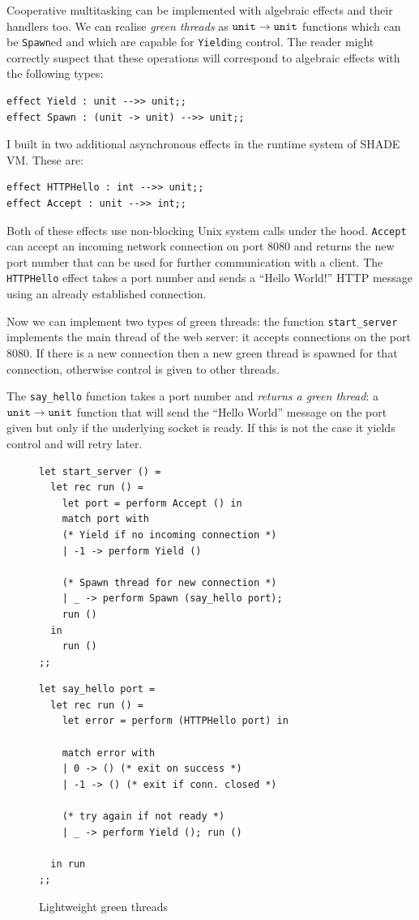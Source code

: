 \documentclass[class=article, crop=false]{standalone}
\begin{document}
Cooperative multitasking can be implemented with algebraic effects and their handlers too. We can realise
\emph{green threads} as $\mathtt{unit} \to \mathtt{unit}$ functions which can be \lstinline|Spawn|ed and which are capable
for \lstinline|Yield|ing control. The reader might correctly suspect that these operations will correspond to
algebraic effects with the following types:
\begin{verbatim}
effect Yield : unit -->> unit;;
effect Spawn : (unit -> unit) -->> unit;;
\end{verbatim}
I built in two additional asynchronous effects in the runtime system of SHADE VM. These are:
\begin{verbatim}
effect HTTPHello : int -->> unit;;
effect Accept : unit -->> int;;
\end{verbatim}
Both of these effects use non-blocking Unix system calls under the hood. \verb|Accept| can accept an incoming network
connection on port 8080 and returns the new port number that can be used for further communication with a client.
The \verb|HTTPHello| effect takes a port number and sends a ``Hello World!'' HTTP message using an already
established connection.

Now we can implement two types of green threads: the function \lstinline|start_server| implements
the main thread of the web server: it accepts connections on the port 8080. If there is a new connection
then a new green thread is spawned for that connection, otherwise control is given to other threads.

The \lstinline{say_hello} function takes a port number and \emph{returns a green thread}: a $\mathtt{unit} \to \mathtt{unit}$
function that will send the ``Hello World'' message on the port given but only if the underlying socket is ready.
If this is not the case it yields control and will retry later.

\begin{figure}
\begin{minipage}{0.6\textwidth}
\begin{Verbatim}[fontsize=\small]
let start_server () =
  let rec run () =
    let port = perform Accept () in
    match port with
    (* Yield if no incoming connection *)
    | -1 -> perform Yield ()

    (* Spawn thread for new connection *)
    | _ -> perform Spawn (say_hello port);
    run ()
  in
    run ()
;;
\end{Verbatim}
\end{minipage}%
\begin{minipage}{.4\textwidth}
\begin{Verbatim}[fontsize=\small]
let say_hello port =
  let rec run () =
    let error = perform (HTTPHello port) in
    
    match error with
    | 0 -> () (* exit on success *)
    | -1 -> () (* exit if conn. closed *)

    (* try again if not ready *)
    | _ -> perform Yield (); run ()

  in run
;;
\end{Verbatim}
\end{minipage}
\caption{Lightweight green threads}
\label{fig:green-threads}
\end{figure}
\end{document}
